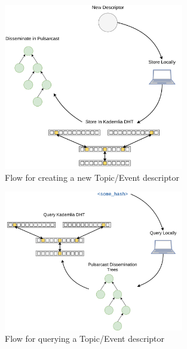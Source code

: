 \begin{figure}[hb!]
  \centering
  \includegraphics[width=0.7\textwidth]{../images/pulsarcast-descriptor-creation.png}
  \caption{Flow for creating a new Topic/Event descriptor}
  \label{fig:pulsarcast-descriptor-creation}
\end{figure}

\begin{figure}[tb!]
  \centering
  \includegraphics[width=0.7\textwidth]{../images/pulsarcast-descriptor-query.png}
  \caption{Flow for querying a Topic/Event descriptor}
  \label{fig:pulsarcast-descriptor-query}
\end{figure}


